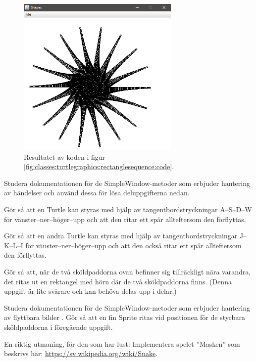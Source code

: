 \begin{figure}[H]
\centering
\includegraphics[width=0.7\textwidth, height = 0.3\pdfpageheight,keepaspectratio]{../img/w06-lab/RectangleSequence.png}
\caption {Resultatet av koden i figur \ref{fig:classes:turtlegraphics:rectanglesequence:code}.}
\label{fig:classes:turtlegraphics:rectanglesequence}

\end{figure}


\Task Studera dokumentationen för de SimpleWindow-metoder som erbjuder hantering av händelser  och använd dessa för lösa deluppgifterna nedan.

\Subtask Gör så att en Turtle kan styras med hjälp av tangentbordstryckningar A--S--D--W för vänster--ner--höger--upp och att den ritar ett spår allteftersom den förflyttas. 

\Subtask Gör så att en andra Turtle kan styras med hjälp av tangentbordstryckningar J--K--L--I för vänster--ner--höger--upp och att den också ritar ett spår allteftersom den förflyttas. 

\Subtask Gör så att, när de två sköldpaddorna ovan befinner sig tillräckligt nära varandra, det ritas ut en rektangel med hörn där de två sköldpaddorna finns. (Denna uppgift är lite svårare och kan behöva delas upp i delar.)


\Task Studera dokumentationen för de SimpleWindow-metoder som erbjuder hantering av flyttbara bilder . Gör så att en fin Sprite ritas vid positionen för de styrbara sköldpaddorna i föregående uppgift.

\Task En riktig utmaning, för den som har lust: Implementera spelet ''Masken'' som beskrivs här: \url{https://sv.wikipedia.org/wiki/Snake}.